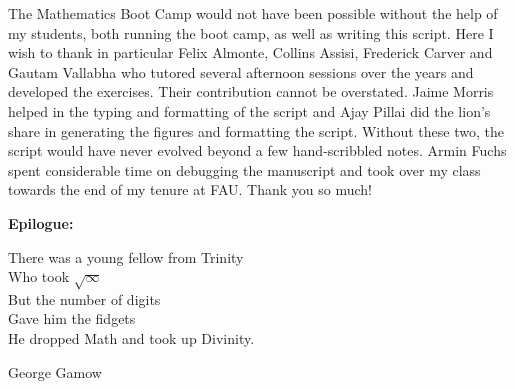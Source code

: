 The Mathematics Boot Camp would not have been possible without the
help of my students, both running the boot camp, as well as
writing this script. Here I wish to thank in particular Felix
Almonte, Collins Assisi, Frederick Carver and Gautam Vallabha who
tutored several afternoon sessions over the years and developed
the exercises. Their contribution cannot be overstated. Jaime
Morris helped in the typing and formatting of the script and Ajay
Pillai did the lion's share in generating the figures and
formatting the script. Without these two, the script would have
never evolved beyond a few hand-scribbled notes. Armin Fuchs spent considerable time on debugging the manuscript and took over my class towards the end of my tenure at FAU. Thank you so much!
\vs \vs







{\bf \large Epilogue:}


\large

There was a young fellow from Trinity \\
Who took $\sqrt{\infty}$ \\
But the number of digits \\
Gave him the fidgets \\
He dropped  Math and took up Divinity.

\hspace*{4cm} George Gamow 













